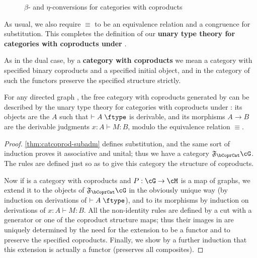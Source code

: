 \documentclass{book}
\let\types\vdash
\def\type{\;\ftype}
\newcommand{\F}[1]{\mathfrak{F}_{#1}}
\def\inl{\mathsf{inl}}
\def\inr{\mathsf{inr}}
\def\case{\mathsf{match}_+}
\def\match{\mathsf{match}}
\def\zero{\mathbf{0}}
\def\abort{\match_{\zero}}
\begin{document}
\begin{figure}
  \centering
  \caption{$\beta$- and $\eta$-conversions for categories with coproducts}
  \label{fig:catcoprod-equiv}
\end{figure}
As usual, we also require $\equiv$ to be an equivalence relation and a congruence for substitution.
This completes the definition of our \textbf{unary type theory for categories with coproducts under \cG}.




As in the dual case, by a \textbf{category with coproducts} we mean a category with specified binary coproducts and a specified initial object, and in the category of such the functors preserve the specified structure strictly.

\begin{thm}\label{thm:catcoprod-initial}
  For any directed graph \cG, the free category with coproducts generated by \cG can be described by the unary type theory for categories with coproducts under \cG: its objects are the $A$ such that $\types A\type$ is derivable, and its morphisms $A\to B$ are the derivable judgments $x:A\types M:B$, modulo the equivalence relation $\equiv$.
\end{thm}
\begin{proof}
  \cref{thm:catcoprod-subadm} defines substitution, and the same sort of induction proves it associative and unital; thus we have a category $\F\bCoprCat\cG$.
  The rules are defined just so as to give this category the structure of coproducts.

  Now if \cM is a category with coproducts and $P:\cG\to\cM$ is a map of graphs, we extend it to the objects of $\F\bCoprCat\cG$ in the obviously unique way (by induction on derivations of $\types A\type$), and to its morphisms by induction on derivations of $x:A\types M:B$.
  All the non-identity rules are defined by a cut with a generator or one of the coproduct structure maps; thus their images in \cM are uniquely determined by the need for the extension to be a functor and to preserve the specified coproducts.
  Finally, we show by a further induction that this extension is actually a functor (preserves all composites).
\end{proof}
\end{document}

